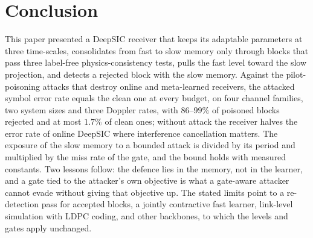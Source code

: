 \documentclass[journal]{IEEEtran}
\begin{document}
\section{Conclusion}\label{sec:conclusion}
This paper presented a DeepSIC receiver that keeps its adaptable parameters at three
time-scales, consolidates from fast to slow memory only through blocks that pass three
label-free physics-consistency tests, pulls the fast level toward the slow projection,
and detects a rejected block with the slow memory. Against the pilot-poisoning attacks
that destroy online and meta-learned receivers, the attacked symbol error rate equals
the clean one at every budget, on four channel families, two system sizes and three
Doppler rates, with $86$--$99\%$ of poisoned blocks rejected and at most $1.7\%$ of clean
ones; without attack the receiver halves the error rate of online DeepSIC where
interference cancellation matters. The exposure of the slow memory to a bounded attack is
divided by its period and multiplied by the miss rate of the gate, and the bound holds
with measured constants. Two lessons follow: the defence lies in the memory, not in the
learner, and a gate tied to the attacker's own objective is what a gate-aware attacker
cannot evade without giving that objective up. The stated limits point to a re-detection
pass for accepted blocks, a jointly contractive fast learner, link-level simulation with
LDPC coding, and other backbones, to which the levels and gates apply unchanged.
\end{document}
